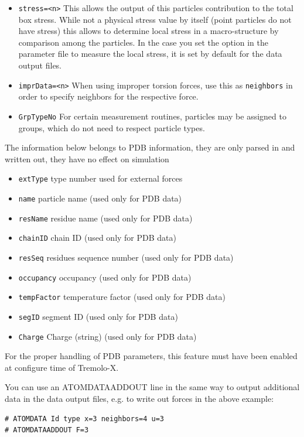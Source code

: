 \begin{itemize}
\item {\tt stress=<n>} This allows the output of this particles contribution to the total box stress. 
  While not a physical stress value by itself (point particles do not have stress) this allows to determine 
  local stress in a macro-structure by comparison among the particles. In the case you set the option in the parameter file to measure the local stress, it is set by default for the data output files.

\item {\tt imprData=<n>} When using improper torsion forces, use this as {\tt neighbors} in order to specify 
  neighbors for the respective force.

\item {\tt GrpTypeNo} For certain measurement routines, particles may be assigned to groups, which do not need 
  to respect particle types. 
\end{itemize}
The information below belongs to PDB information, they are only parsed in and written out, they have no effect on simulation
\begin{itemize}
\item {\tt extType} type number used for external forces 
\item {\tt name} particle name (used only for PDB data)
\item {\tt resName} residue name (used only for PDB data)
\item {\tt chainID} chain ID (used only for PDB data)
\item {\tt resSeq} residues sequence number (used only for PDB data)
\item {\tt occupancy} occupancy (used only for PDB data)
\item {\tt tempFactor} temperature factor (used only for PDB data)
\item {\tt segID} segment ID (used only for PDB data)
\item {\tt Charge} Charge (string) (used only for PDB data)
\end{itemize}
For the proper handling of PDB parameters, this feature must have been enabled at configure time of Tremolo-X. 

You can use an ATOMDATAADDOUT line in the same way to output additional data in the data output files, e.g. to write out forces in the above example:
 \begin{lstlisting}
# ATOMDATA Id type x=3 neighbors=4 u=3
# ATOMDATAADDOUT F=3
\end{lstlisting}

